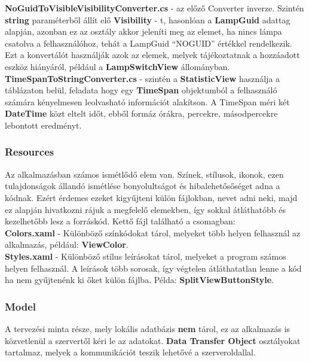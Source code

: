 \documentclass[a4paper,12pt]{report}
\begin{document}
    \textbf{NoGuidToVisibleVisibilityConverter.cs} - az előző Converter inverze. Szintén \textbf{string} paraméterből állít elő
    \textbf{Visibility} - t, hasonlóan a \textbf{LampGuid} adattag alapján, azonban ez az osztály akkor jeleníti meg az elemet,
    ha nincs lámpa csatolva a felhasználóhoz, tehát a LampGuid ``NOGUID'' értékkel rendelkezik. Ezt a konvertálót használják azok az
    elemek, melyek tájékoztatnak a hozzáadott eszköz hiányáról, például a \textbf{LampSwitchView} állományban.\\

    \textbf{TimeSpanToStringConverter.cs} - szintén a \textbf{StatisticView} használja a táblázaton belül, feladata hogy egy \textbf{TimeSpan}
    objektumból a felhasználó számára kényelmesen leolvasható információt alakítson. A TimeSpan méri két \textbf{DateTime} közt eltelt
    időt, ebből formáz órákra, percekre, másodpercekre lebontott eredményt.

\subsubsection{Resources}
    Az alkalmazásban számos ismétlődő elem van. Színek, stílusok, ikonok, ezen tulajdonságok állandó ismétlése bonyolultságot
    és hibalehetősőséget adna a kódnak. Ezért érdemes ezeket kigyűjteni külön fájlokban, nevet adni neki, majd ez alapján hivatkozni
    rájuk a megfelelő elemekben, így sokkal átláthatóbb és kezelhetőbb lesz a forráskód. Kettő fájl található a csomagban:\\

    \textbf{Colors.xaml} - Különböző színkódokat tárol, melyeket több helyen felhasznál az alkalmazás, például: \textbf{ViewColor}.\\

    \textbf{Styles.xaml} - Különböző stílus leírásokat tárol, melyeket a program számos helyen felhasznál. A leírások több sorosak,
    így végtelen átláthatatlan lenne a kód ha nem gyűjtenénk ki őket külön fájlba. Példa: \textbf{SplitViewButtonStyle}.

\subsubsection{Model}
    A tervezési minta része, mely lokális adatbázis \textbf{nem} tárol, ez az alkalmazás is közvetlenül a szervertől kéri le az
    adatokat. \textbf{Data Transfer Object} osztályokat tartalmaz, melyek a kommunikációt teszik lehetővé a szerveroldallal.
\end{document}
